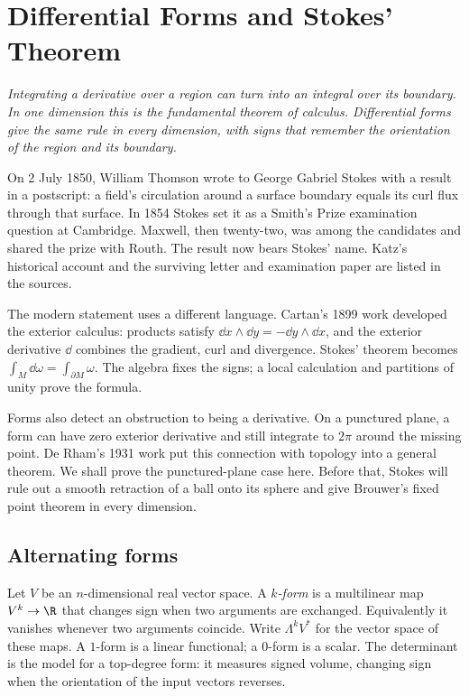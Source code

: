 \chapter{Differential Forms and Stokes' Theorem}

\begin{center}\itshape
Integrating a derivative over a region can turn into an integral over its boundary. In one dimension this is the fundamental theorem of calculus. Differential forms give the same rule in every dimension, with signs that remember the orientation of the region and its boundary.
\end{center}

On 2 July 1850, William Thomson wrote to George Gabriel Stokes with a result in a postscript: a field's circulation around a surface boundary equals its curl flux through that surface. In 1854 Stokes set it as a Smith's Prize examination question at Cambridge. Maxwell, then twenty-two, was among the candidates and shared the prize with Routh. The result now bears Stokes' name. Katz's historical account and the surviving letter and examination paper are listed in the sources.

The modern statement uses a different language. Cartan's 1899 work developed the exterior calculus: products satisfy $\dd x\wedge\dd y=-\dd y\wedge\dd x$, and the exterior derivative $\dd$ combines the gradient, curl and divergence. Stokes' theorem becomes $\int_M\dd\omega=\int_{\partial M}\omega$. The algebra fixes the signs; a local calculation and partitions of unity prove the formula.

Forms also detect an obstruction to being a derivative. On a punctured plane, a form can have zero exterior derivative and still integrate to $2\pi$ around the missing point. De Rham's 1931 work put this connection with topology into a general theorem. We shall prove the punctured-plane case here. Before that, Stokes will rule out a smooth retraction of a ball onto its sphere and give Brouwer's fixed point theorem in every dimension.

\section{Alternating forms}

Let $V$ be an $n$-dimensional real vector space. A \emph{$k$-form} is a multilinear map $V^k\to\R$ that changes sign when two arguments are exchanged. Equivalently it vanishes whenever two arguments coincide. Write $\Lambda^kV^*$ for the vector space of these maps. A $1$-form is a linear functional; a $0$-form is a scalar. The determinant is the model for a top-degree form: it measures signed volume, changing sign when the orientation of the input vectors reverses.

